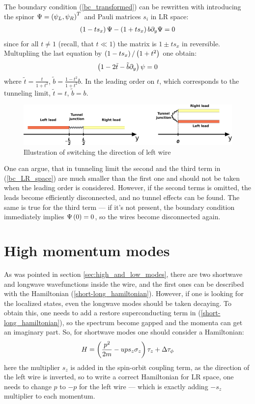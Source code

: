 The boundary condition (\ref{bc_transformed}) can be rewritten with introducing the spinor $ \Psi=\left(\psi_L, \psi_R\right)^T $ and Pauli matrices $ s_i $ in LR space:
\begin{gather}
	\left(1-ts_x\right)\Psi-\left(1+t s_x\right)b\partial_y\Psi=0
\end{gather}
since for all $ t\ne 1 $ (recall, that $ t\ll1 $) the matrix is $ 1\pm ts_x $ in reversible. Multupliing the last equation by $ \left(1-ts_x\right)/\left(1+t^2\right) $ one obtain:
\begin{gather}
\label{bc_LR_space}
	\left(1-2\tilde{t}-\tilde{b}\partial_y\right)\psi=0
\end{gather}
where $ \tilde{t}=\frac{t}{1+t^2} $, $ \tilde{b} = \frac{1-t^2}{1+t^2}b $. In the leading order on $ t $, which corresponds to the tunneling limit, $ \tilde{t}=t $, $ \tilde{b} = b $.
\begin{figure}[H]
	\centering
	\includegraphics[width=0.9\linewidth]{images/bc_transform}
	\caption{Illustration of switching the direction of left wire}
	\label{fig:bctransform}
\end{figure}

One can argue, that in tunneling limit the second and the third term in (\ref{bc_LR_space}) are much smaller than the first one and should not be taken when the leading order is considered. However, if the second terms is omitted, the leads become efficiently disconnected, and no tunnel effects can be found. The same is true for the third term --- if it's not present, the boundary condition immediately implies $ \Psi\left(0\right) = 0 $, so the wires become disconnected again.

\section{High momentum modes}  

As was pointed in section \ref{sec:high_and_low_modes}, there are two  shortwave and longwave wavefunctions inside the wire, and the first ones can be described with the Hamiltonian (\ref{short-long_hamiltonian}). However, if one is looking for the localized states, even the longwave modes should be taken decaying. To obtain this, one needs to add a restore superconducting term in (\ref{short-long_hamiltonian}), so the spectrum become gapped and the momenta can get an imaginary part. So, for shortwave modes one should consider a Hamiltonian:
\begin{gather}
\label{high_mods_hamiltonian}
	H=\left(\frac{p^2}{2m}-ups_z\sigma_z\right)\tau_z+\Delta\tau_\phi
\end{gather}
here the multiplier $ s_z $ is added in the spin-orbit coupling term, as the direction of the left wire is inverted, so to write a correct Hamiltonian for LR space, one needs to change $ p $ to $ -p $ for the left wire --- which is exactly adding $ -s_z $ multiplier to each momentum.


